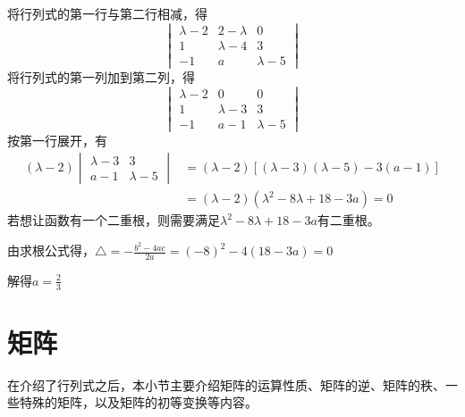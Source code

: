 \documentclass[12pt, a4paper, oneside, UTF8]{ctexbook}
\begin{document}
\begin{solution}
    将行列式的第一行与第二行相减，得\[
        \begin{vmatrix}
            \lambda-2&2-\lambda&0\\
            1&\lambda-4&3\\
            -1&a&\lambda-5
        \end{vmatrix}
    \]
    将行列式的第一列加到第二列，得\[
        \begin{vmatrix}
            \lambda-2&0&0\\
            1&\lambda-3&3\\
            -1&a-1&\lambda-5
        \end{vmatrix}
    \]
    按第一行展开，有\[
        \begin{aligned}(\lambda-2)
        \begin{vmatrix}
            \lambda-3&3\\
            a-1&\lambda-5
        \end{vmatrix}&=(\lambda-2)[(\lambda-3)(\lambda-5)-3(a-1)]\\
        &=(\lambda-2)(\lambda^2-8\lambda+18-3a)=0
    \end{aligned}
    \]
    若想让函数有一个二重根，则需要满足$\lambda^2-8\lambda+18-3a$有二重根。

    由求根公式得，$\triangle=-\frac{b^2-4ac}{2a}=(-8)^2-4(18-3a)=0$

    解得$a=\frac{2}{3}$
\end{solution}
\section{矩阵}
在介绍了行列式之后，本小节主要介绍矩阵的运算性质、矩阵的逆、矩阵的秩、一些特殊的矩阵，以及矩阵的初等变换等内容。
\end{document}
